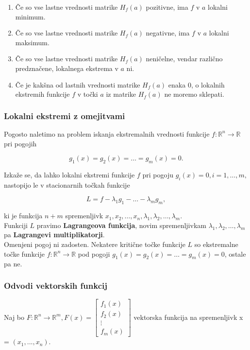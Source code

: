 \documentclass{article}
\begin{document}
\begin{multicols}{2}
	\begin{enumerate}
		\item Če so vse lastne vrednosti matrike \( H_f(a) \) pozitivne, ima \( f \) v \( a \) lokalni minimum.
		\item Če so vse lastne vrednosti matrike \( H_f(a) \) negativne, ima \( f \) v \( a \) lokalni maksimum.
		\item Če so vse lastne vrednosti matrike \( H_f(a) \) neničelne, vendar različno predznačene, lokalnega ekstrema v \( a \) ni.
		\item Če je kakšna od lastnih vrednosti matrike \( H_f(a) \) enaka 0, o lokalnih ekstremih funkcije \( f \) v točki \( a \) iz matrike \( H_f(a) \) ne moremo sklepati.
	\end{enumerate}


	\subsubsection{Lokalni ekstremi z omejitvami}

	Pogosto naletimo na problem iskanja ekstremalnih vrednosti funkcije \( f: \mathbb{R}^n \rightarrow \mathbb{R} \) pri pogojih

	\[ g_1(x) = g_2(x) = \ldots = g_m(x) = 0. \]

	Izkaže se, da lahko lokalni ekstremi funkcije \( f \) pri pogoju \( g_i(x) = 0, i = 1, \ldots, m, \) nastopijo le v stacionarnih točkah funkcije

	\[ L = f - \lambda_1 g_1 - \ldots - \lambda_m g_m, \]

	ki je funkcija \( n + m \) spremenljivk \( x_1, x_2, \ldots, x_n, \lambda_1, \lambda_2, \ldots, \lambda_m \).\\
	Funkciji \( L \) pravimo \textbf{Lagrangeova funkcija}, novim spremenljivkam \( \lambda_1, \lambda_2, \ldots, \lambda_m \) pa \textbf{Lagrangevi multiplikatorji}.\\
	Omenjeni pogoj ni zadosten. Nekatere kritične točke funkcije \( L \) so ekstremalne točke funkcije \( f: \mathbb{R}^n \rightarrow \mathbb{R} \) pod pogoji \( g_1(x) = g_2(x) = \ldots = g_m(x) = 0 \), ostale pa ne.


	\subsubsection{Odvodi vektorskih funkcij}
	Naj bo \( F: \mathbb{R}^n \rightarrow \mathbb{R}^m, F(x) =
	\begin{bmatrix}
		f_1(x) \\
		f_2(x) \\
		\vdots \\
		f_m(x)
	\end{bmatrix} \)
	vektorska funkcija na spremenljivk x = \( (x_1, ..., x_n) \).


\end{multicols}
\end{document}

